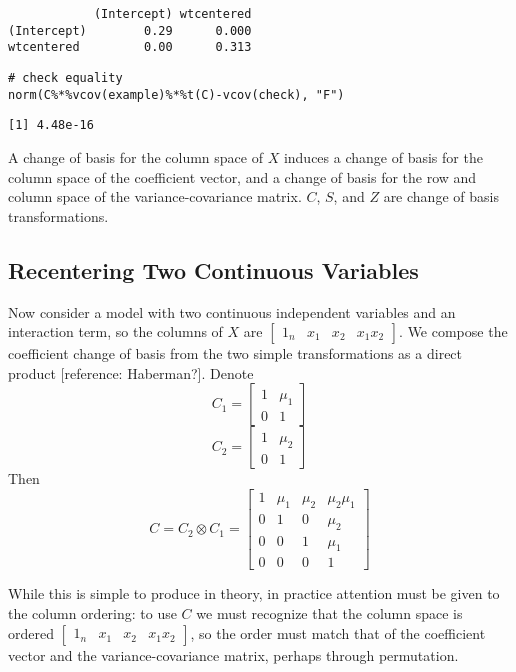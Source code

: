 \documentclass[]{article}
\begin{document}
\begin{verbatim}
            (Intercept) wtcentered
(Intercept)        0.29      0.000
wtcentered         0.00      0.313
\end{verbatim}

\begin{verbatim}
# check equality
norm(C%*%vcov(example)%*%t(C)-vcov(check), "F")
\end{verbatim}

\begin{verbatim}
[1] 4.48e-16
\end{verbatim}

A change of basis for the column space of \(X\) induces a change of
basis for the column space of the coefficient vector, and a change of
basis for the row and column space of the variance-covariance matrix.
\(C\), \(S\), and \(Z\) are change of basis transformations.

\subsection{Recentering Two Continuous
Variables}\label{recentering-two-continuous-variables}

Now consider a model with two continuous independent variables and an
interaction term, so the columns of \(X\) are
\(\begin{bmatrix} 1_n &x_1 &x_2 &x_1x_2 \end{bmatrix}\). We compose the
coefficient change of basis from the two simple transformations as a
direct product {[}reference: Haberman?{]}. Denote
\[C_1=\begin{bmatrix}1 & \mu_1 \\ 0 & 1 \end{bmatrix}\]
\[C_2=\begin{bmatrix}1 & \mu_2 \\ 0 & 1 \end{bmatrix}\] Then
\[C = C_2 \otimes C_1 = \begin{bmatrix} 1 & \mu_1 &\mu_2 &\mu_2\mu_1 \\
  0 &1 &0 &\mu_2 \\ 0 &0 &1 &\mu_1 \\ 0 &0 &0 &1 \end{bmatrix}\]

While this is simple to produce in theory, in practice attention must be
given to the column ordering: to use \(C\) we must recognize that the
column space is ordered
\(\begin{bmatrix} 1_n &x_1 &x_2 &x_1x_2 \end{bmatrix}\), so the order
must match that of the coefficient vector and the variance-covariance
matrix, perhaps through permutation.
\end{document}
